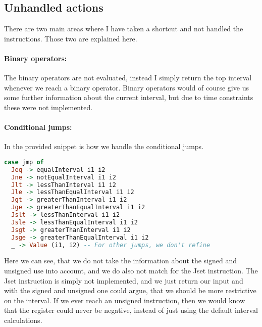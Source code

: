 \subsection{Unhandled actions}
There are two main areas where I have taken a shortcut and not handled the instructions. Those two are explained here.

\paragraph{Binary operators: } The binary operators are not evaluated, instead
I simply return the top interval whenever we reach a binary operator. Binary
operators would of course give us some further information about the current
interval, but due to time constraints these were not implemented.

\paragraph{Conditional jumps: } 
In the provided snippet is how we handle the conditional jumps.
\begin{lstlisting}[language={haskell}, numbers=none]
case jmp of
  Jeq -> equalInterval i1 i2
  Jne -> notEqualInterval i1 i2
  Jlt -> lessThanInterval i1 i2
  Jle -> lessThanEqualInterval i1 i2
  Jgt -> greaterThanInterval i1 i2
  Jge -> greaterThanEqualInterval i1 i2
  Jslt -> lessThanInterval i1 i2
  Jsle -> lessThanEqualInterval i1 i2
  Jsgt -> greaterThanInterval i1 i2
  Jsge -> greaterThanEqualInterval i1 i2
  _ -> Value (i1, i2) -- For other jumps, we don't refine
\end{lstlisting}

Here we can see, that we do not take the information about the signed and
unsigned use into account, and we do also not match for the Jset instruction.
The Jset instruction is simply not implemented, and we just return our input
and with the signed and unsigned one could argue, that we should be more
restrictive on the interval. If we ever reach an unsigned instruction, then we
would know that the register could never be negative, instead of just using the
default interval calculations.
